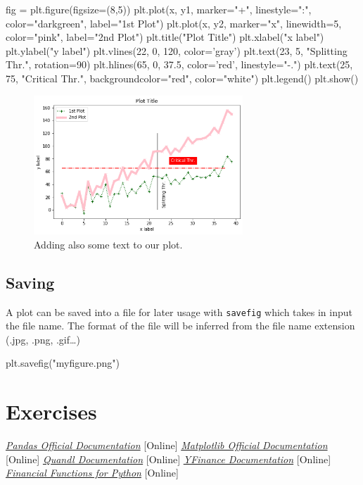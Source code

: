 \begin{ipython}
fig = plt.figure(figsize=(8,5))
plt.plot(x, y1, marker="+", linestyle=":", color="darkgreen", label="1st Plot")
plt.plot(x, y2, marker="x", linewidth=5, color="pink", label="2nd Plot")
plt.title("Plot Title")
plt.xlabel("x label")
plt.ylabel("y label")
plt.vlines(22, 0, 120, color='gray')
plt.text(23, 5, "Splitting Thr.", rotation=90)
plt.hlines(65, 0, 37.5, color='red', linestyle="-.")
plt.text(25, 75, "Critical Thr.", backgroundcolor="red", color="white")
plt.legend()
plt.show()
\end{ipython}

\begin{figure}[htb]
	\centering
	\includegraphics[width=0.7\textwidth]{figures/text}
	\caption{Adding also some text to our plot.}
	\label{fig:text}
\end{figure}

\subsection{Saving}\label{saving}

A plot can be saved into a file for later usage with \texttt{savefig} which takes in input the file name. The format of the file will be inferred from the file name extension (.jpg, .png, .gif\ldots)

\begin{ipython}
plt.savefig("myfigure.png")
\end{ipython}

\section*{Exercises}


\begin{thebibliography}{9}
 \href{https://pandas.pydata.org/docs/}{\emph{Pandas Official Documentation}} [Online]
 \href{https://matplotlib.org}{\emph{Matplotlib Official Documentation}} [Online]
 \href{https://docs.quandl.com/}{\emph{Quandl Documentation}} [Online]
 \href{https://github.com/ranaroussi/yfinance}{\emph{YFinance Documentation}} [Online]
 \href{https://pmorissette.github.io/ffn/}{\emph{Financial Functions for Python}} [Online]
\end{thebibliography}
